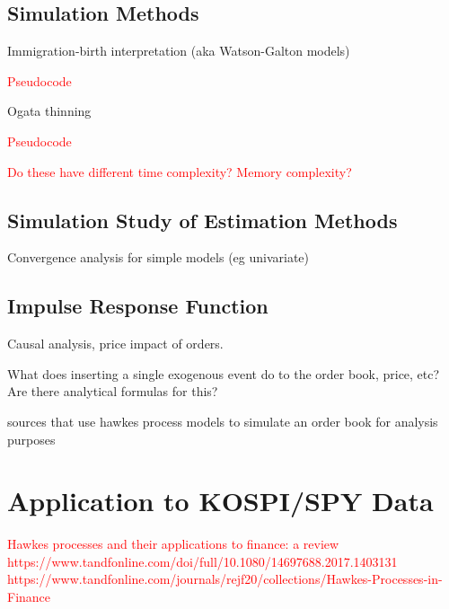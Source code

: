 \documentclass[honours,12pt]{unswthesis}
\numberwithin{equation}{section}
\begin{document}
\section{Simulation Methods}
Immigration-birth interpretation \cite{MorariuPatrichiPakkanen}
(aka Watson-Galton models)

\textcolor{red}{Pseudocode}

Ogata thinning 

\textcolor{red}{Pseudocode}

\textcolor{red}{Do these have different time complexity? Memory complexity?}

\section{Simulation Study of Estimation Methods}
Convergence analysis for simple models (eg univariate)

\section{Impulse Response Function}
Causal analysis, price impact of orders.

What does inserting a single exogenous event do to the order book, price, etc? Are there analytical formulas for this?


\cite{AbergelJedidi} \cite{Toke} sources that use hawkes process models to simulate an order book for analysis purposes


\chapter{Application to KOSPI/SPY Data} %
\textcolor{red}{Hawkes processes and their applications to finance: a review https://www.tandfonline.com/doi/full/10.1080/14697688.2017.1403131}
\textcolor{red}{https://www.tandfonline.com/journals/rejf20/collections/Hawkes-Processes-in-Finance}
\end{document}
